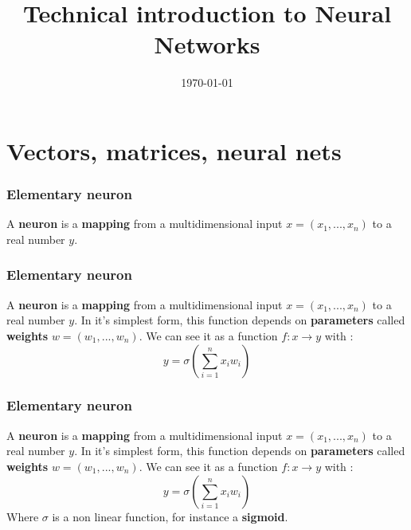 \documentclass{beamer}
\title[Neural Networks]{Technical introduction to Neural Networks}
\date{\today}
\begin{document}
\begin{frame}
\titlepage 
\end{frame}

\begin{frame}
    \tableofcontents
\end{frame}

\section{Vectors, matrices, neural nets}%
\label{sec:vectors_matrices_neural_nets}

\begin{frame}
\frametitle{Elementary neuron}
    A \textbf{{neuron}} is a \textbf{{mapping}} from a multidimensional input
    $x=(x_1,...,x_n)$ to a real number $y$.\end{frame}
\begin{frame}

\frametitle{Elementary neuron}
    A \textbf{{neuron}} is a \textbf{{mapping}} from a multidimensional input
    $x=(x_1,...,x_n)$ to a real number $y$. In it's simplest form, this
    function depends on \textbf{{parameters}} called \textbf{{weights}}
    $w=(w_1,...,w_n)$.  We can see it as a function $ f : x
    \rightarrow y$ with :
    \begin{equation}
        y=\sigma( \sum^{n}_{i=1} x_iw_i )
    \end{equation}
\end{frame}


\begin{frame}
\frametitle{Elementary neuron}
    A \textbf{{neuron}} is a \textbf{{mapping}} from a multidimensional input
    $x=(x_1,...,x_n)$ to a real number $y$. In it's simplest form, this
    function depends on \textbf{{parameters}} called \textbf{{weights}}
    $w=(w_1,...,w_n)$.  We can see it as a function $ f : x
    \rightarrow y$ with :
    \begin{equation}
        y=\sigma( \sum^{n}_{i=1} x_iw_i )
    \end{equation}
Where $\sigma$ is a non linear function, for instance a \textbf{{sigmoid}}.
\end{frame}
\end{document}
